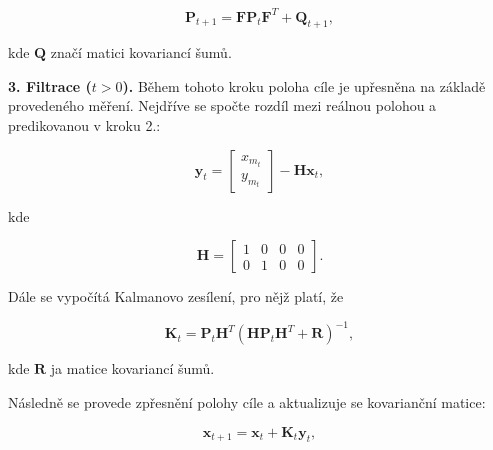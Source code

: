 \documentclass[twoside]{ctuthesis}
\theoremstyle{plain}
\theoremstyle{definition}
\theoremstyle{note}
\begin{document}
\begin{equation}	
\boldsymbol{P}_{t+1} = \boldsymbol{F}\boldsymbol{P}_t\boldsymbol{F}^T + \boldsymbol{Q}_{t+1},
\end{equation}

kde $\boldsymbol{Q}$ značí matici kovariancí šumů.

\textbf{3. Filtrace ($t > 0$).} Během tohoto kroku poloha cíle je upřesněna na základě provedeného měření. Nejdříve se spočte rozdíl mezi reálnou polohou a predikovanou v kroku 2.:

\begin{equation}
\boldsymbol{y}_{t} = \begin{bmatrix}
x_{m_t}\\y_{m_t}
\end{bmatrix} - \boldsymbol{H}\boldsymbol{x}_t,
\end{equation}

kde 

\begin{equation}
\boldsymbol{H} = \begin{bmatrix}
1&0&0&0\\
0&1&0&0
\end{bmatrix}.
\end{equation}

Dále se vypočítá Kalmanovo zesílení, pro nějž platí, že

\begin{equation}
\boldsymbol{K}_t = \boldsymbol{P}_t\boldsymbol{H}^T(\boldsymbol{H}\boldsymbol{P}_t\boldsymbol{H}^T + \boldsymbol{R})^{-1},
\end{equation}

kde $\boldsymbol{R}$ ja matice kovariancí šumů.

Následně se provede zpřesnění polohy cíle a aktualizuje se kovarianční matice:

\begin{equation}
\boldsymbol{x}_{t+1} = \boldsymbol{x}_t + \boldsymbol{K}_t\boldsymbol{y}_t,
\end{equation}
\end{document}
